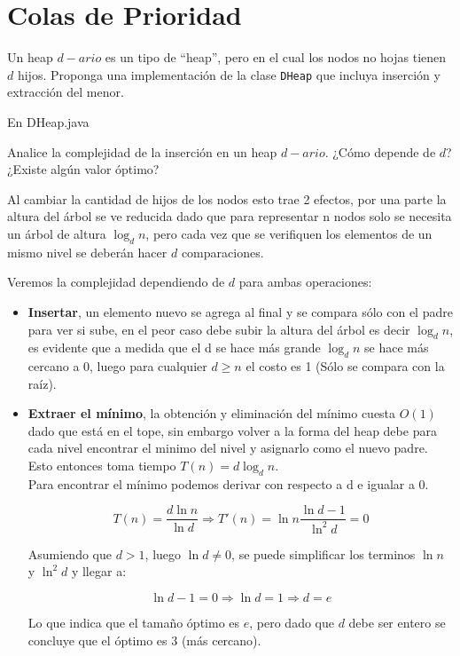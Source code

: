 \documentclass[dcc,sol]{fcfmcourse}
\begin{document}
\section*{Colas de Prioridad}
\begin{problems}
\problem Un heap $d-ario$ es un tipo de ``heap'', pero en el cual los nodos no hojas tienen $d$ hijos. Proponga una implementación de la clase \texttt{DHeap} que incluya inserción y extracción del menor.
\begin{solution}
En DHeap.java
\end{solution}
\problem Analice la complejidad de la inserción en un heap $d-ario$. ¿Cómo depende de $d$? ¿Existe algún valor óptimo?

\begin{solution}
Al cambiar la cantidad de hijos de los nodos esto trae 2 efectos, por una parte la altura del árbol se ve reducida dado que para representar n nodos solo se necesita un árbol de altura $\log_d{n}$, pero cada vez que se verifiquen los elementos de un mismo nivel se deberán hacer $d$ comparaciones.

Veremos la complejidad dependiendo de $d$ para ambas operaciones:

\begin{itemize}

\item \textbf{Insertar}, un elemento nuevo se agrega al final y se compara sólo con el padre para ver si sube, en el peor caso debe subir la altura del árbol es decir $\log_d{n}$, es evidente que a medida que el d se hace más grande $\log_d{n}$ se hace más cercano a 0, luego para cualquier $d\geq n$ el costo es 1 (Sólo se compara con la raíz). \\

\item \textbf{Extraer el mínimo}, la obtención y eliminación del mínimo cuesta $O(1)$ dado que está en el tope, sin embargo volver a la forma del heap debe para cada nivel encontrar el minimo del nivel y asignarlo como el nuevo padre. Esto entonces toma tiempo $T(n) = d\log_d{n}$. \\

Para encontrar el mínimo podemos derivar con respecto a d e igualar a 0.

\begin{equation*}
    T(n) = \frac{d\ln{n}}{\ln{d}} \Rightarrow
    T'(n) = \ln{n}\frac{\ln{d}-1}{\ln^2{d}} = 0
\end{equation*}

Asumiendo que $d>1$, luego $\ln{d} \neq 0$, se puede simplificar los terminos $\ln{n}$ y $\ln^2{d}$ y llegar a:

\begin{equation*}
    \ln{d}-1=0 \Rightarrow \ln{d} = 1 \Rightarrow d = e
\end{equation*}

Lo que indica que el tamaño óptimo es $e$, pero dado que $d$ debe ser entero se concluye que el óptimo es 3 (más cercano).

\end{itemize}



\end{solution}


\end{problems}
\end{document}
